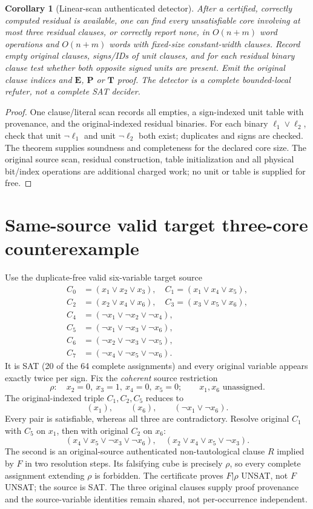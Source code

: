 \documentclass[11pt]{article}
\newtheorem{corollary}{Corollary}
\begin{document}
\begin{corollary}[Linear-scan authenticated detector]
After a certified, correctly computed residual is available, one can find every unsatisfiable core involving at most three residual clauses, or correctly report none, in $O(n+m)$ word operations and $O(n+m)$ words with fixed-size constant-width clauses. Record empty original clauses, signs/IDs of unit clauses, and for each residual binary clause test whether both opposite signed units are present. Emit the original clause indices and $\mathbf E$, $\mathbf P$ or $\mathbf T$ proof. The detector is a complete \emph{bounded-local refuter}, not a complete SAT decider.
\end{corollary}
\begin{proof}
One clause/literal scan records all empties, a sign-indexed unit table with provenance, and the original-indexed residual binaries. For each binary $\ell_1\vee\ell_2$, check that unit $\neg\ell_1$ and unit $\neg\ell_2$ both exist; duplicates and signs are checked. The theorem supplies soundness and completeness for the declared core size. The original source scan, residual construction, table initialization and all physical bit/index operations are additional charged work; no unit or table is supplied for free.
\end{proof}

\section{Same-source valid target three-core counterexample}
Use the duplicate-free valid six-variable target source
\[
\begin{split}
C_0&=(x_1\vee x_2\vee x_3),\quad C_1=(x_1\vee x_4\vee x_5),\\
C_2&=(x_2\vee x_4\vee x_6),\quad C_3=(x_3\vee x_5\vee x_6),\\
C_4&=(\neg x_1\vee\neg x_2\vee\neg x_4),\\
C_5&=(\neg x_1\vee\neg x_3\vee\neg x_6),\\
C_6&=(\neg x_2\vee\neg x_3\vee\neg x_5),\\
C_7&=(\neg x_4\vee\neg x_5\vee\neg x_6).
\end{split}
\]
It is SAT (20 of the 64 complete assignments) and every original variable appears exactly twice per sign. Fix the \emph{coherent} source restriction
\[
\rho:\quad x_2=0,\ x_3=1,\ x_4=0,\ x_5=0;\qquad x_1,x_6\text{ unassigned}.
\]
The original-indexed triple $C_1,C_2,C_5$ reduces to
\[
 (x_1),\qquad(x_6),\qquad(\neg x_1\vee\neg x_6).
\]
Every pair is satisfiable, whereas all three are contradictory. Resolve original $C_1$ with $C_5$ on $x_1$, then with original $C_2$ on $x_6$:
\[
 (x_4\vee x_5\vee\neg x_3\vee\neg x_6),
 \quad (x_2\vee x_4\vee x_5\vee\neg x_3).
\]
The second is an original-source authenticated non-tautological clause $R$ implied by $F$ in two resolution steps. Its falsifying cube is precisely $\rho$, so every complete assignment extending $\rho$ is forbidden. The certificate proves $F|\rho$ UNSAT, not $F$ UNSAT; the source is SAT. The three original clauses supply proof provenance and the source-variable identities remain shared, not per-occurrence independent.
\end{document}
